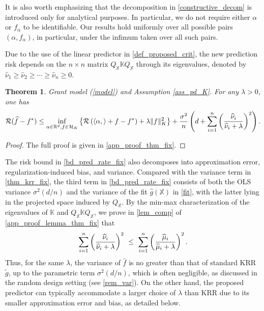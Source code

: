 \documentclass[11pt,twoside]{article}
\newtheorem{theorem}{Theorem}
\def\KK{\mathbb{K}}
\def\XX{\mathbb{X}}
\def\RR{\mathbb{R}}
\def\cH{\mathcal H}
\def\cR{\mathcal R}
\def\wh{\widehat}
\def\wt{\widetilde}
\def\l{\left}
\def\r{\right}
\begin{document}
It is also worth emphasizing that the decomposition in \eqref{constructive_decom} is introduced only for analytical purposes. In particular, we do not require either $\alpha$ or $f_\alpha$ to be identifiable. Our results hold uniformly over all possible pairs $(\alpha, f_\alpha)$, in particular, under the infimum taken over all such pairs.


Due to the use of the linear predictor in \eqref{def_proposed_crit}, the new prediction risk depends on the $n\times n$ matrix $Q_{\XX} \KK Q_{\XX}$ through its eigenvalues, denoted by $\wh \nu_1 \ge \wh \nu_2 \ge \cdots \ge \wh \nu_n \ge 0$.
 
\begin{theorem}\label{thm_fix}
Grant model (\ref{model}) and
Assumption  \ref{ass_pd_K}. For any $\lambda >0$, one has
\begin{align}\label{bd_pred_rate_fix}
      \cR(\wh f-f^*) \le   \inf_{\alpha \in \RR^d, f\in \cH_K}\left\{  \cR\l(\langle \alpha,\rangle + f-f^*\r) +  \lambda \|f\|_K^2  \right\}+ {\sigma^2\over n}  \left(  d + \sum_{i=1}^n \left(\wh\nu_i\over \wh\nu_i + \lambda\right)^2\right).
\end{align}    
\end{theorem}
\begin{proof}
   The full proof is given in \cref{app_proof_thm_fix}. 
\end{proof}

The risk bound in \eqref{bd_pred_rate_fix} also decomposes into approximation error, regularization-induced bias, and variance. Compared with the variance term in \cref{thm_krr_fix}, the third term in \eqref{bd_pred_rate_fix} consists of both the OLS variance $\sigma^2(d/n)$ and the variance of the fit $\wh g(\XX)$ in \eqref{fit}, with the latter lying in the projected space induced by $Q_{\XX}$. By the min-max characterization of the eigenvalues of $\KK$ and $Q_{\XX} \KK Q_{\XX}$, we prove in \cref{lem_comp} of \cref{app_proof_lemma_thm_fix} that
\begin{equation}\label{var_comp}
  \sum_{i=1}^n  \left(\wh\nu_i \over \wh\nu_i + \lambda\right)^2~ \le  ~  \sum_{i=1}^n  \left(\wh\mu_i \over \wh\mu_i + \lambda \right)^2. 
\end{equation}
Thus, for the same $\lambda$, the variance of $\wh f$ is no greater than that of standard KRR $\wt g$, up to the parametric term $\sigma^2 (d/n)$, which is often negligible, as discussed in the random design setting (see \cref{rem_var}). On the other hand, the proposed predictor can typically accommodate a larger choice of $\lambda$ than KRR due to its smaller approximation error and bias, as detailed below.
\end{document}
